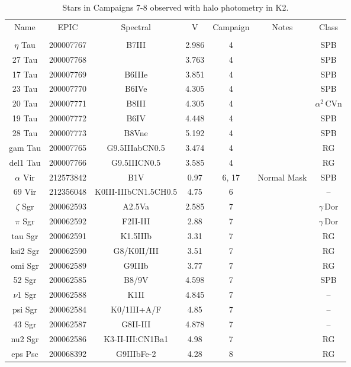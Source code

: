 \begin{table*}
\caption{Stars in Campaigns 7-8 observed with halo photometry in K2.\label{table_0}}
\begin{tabular}{ccccccc}
\hline \hline
Name & EPIC & Spectral & V & Campaign & Notes & Class \\
 &  &  &  &  &  &  \\
\hline
$\eta$ Tau & 200007767 & B7III & 2.986 & 4 & \tablenotemark{a} & SPB \\
27 Tau & 200007768 &  & 3.763 & 4 & \tablenotemark{a} & SPB \\
17 Tau & 200007769 & B6IIIe & 3.851 & 4 & \tablenotemark{a} & SPB \\
23 Tau & 200007770 & B6IVe & 4.305 & 4 & \tablenotemark{a} & SPB \\
20 Tau & 200007771 & B8III & 4.305 & 4 & \tablenotemark{a} & $\alpha^2\,\text{CVn}$ \\
19 Tau & 200007772 & B6IV & 4.448 & 4 & \tablenotemark{a} & SPB \\
28 Tau & 200007773 & B8Vne & 5.192 & 4 & \tablenotemark{a} & SPB \\
gam Tau & 200007765 & G9.5IIIabCN0.5 & 3.474 & 4 &  & RG \\
del1 Tau & 200007766 & G9.5IIICN0.5 & 3.585 & 4 &  & RG \\
$\alpha$ Vir & 212573842 & B1V & 0.97 & 6, 17 & Normal Mask & SPB \\
69 Vir & 212356048 & K0III-IIIbCN1.5CH0.5 & 4.75 & 6 &  & -- \\
$\zeta$ Sgr & 200062593 & A2.5Va & 2.585 & 7 &  & $\gamma\,\text{Dor}$ \\
$\pi$ Sgr & 200062592 & F2II-III & 2.88 & 7 &  & $\gamma\,\text{Dor}$ \\
tau Sgr & 200062591 & K1.5IIIb & 3.31 & 7 &  & RG \\
ksi2 Sgr & 200062590 & G8/K0II/III & 3.51 & 7 &  & RG \\
omi Sgr & 200062589 & G9IIIb & 3.77 & 7 &  & RG \\
52 Sgr & 200062585 & B8/9V & 4.598 & 7 &  & SPB \\
$\nu$1 Sgr & 200062588 & K1II & 4.845 & 7 &  & -- \\
psi Sgr & 200062584 & K0/1III+A/F & 4.85 & 7 &  & -- \\
43 Sgr & 200062587 & G8II-III & 4.878 & 7 &  & -- \\
nu2 Sgr & 200062586 & K3-II-III:CN1Ba1 & 4.98 & 7 &  & RG \\
eps Psc & 200068392 & G9IIIbFe-2 & 4.28 & 8 &  & RG \\

\end{tabular}
\end{table*}
